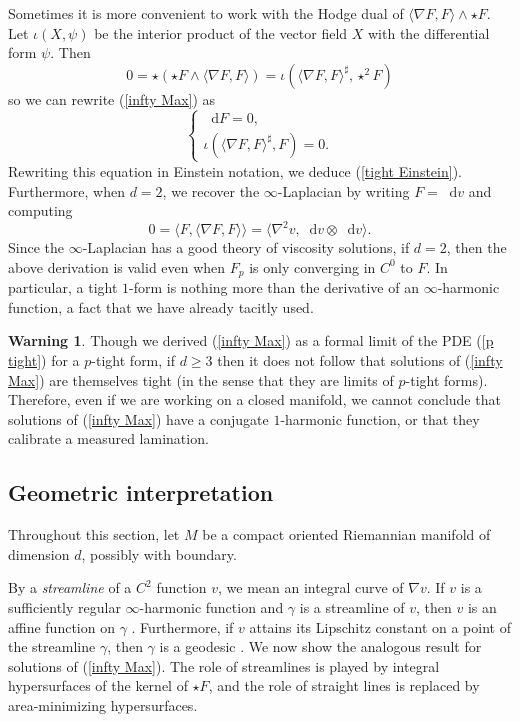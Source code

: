 \documentclass[reqno,11pt]{amsart}
\newcommand*\dif{\mathop{}\!\mathrm{d}}
\newcommand{\dfn}[1]{\emph{#1}\index{#1}}
\theoremstyle{definition}
\newtheorem{warning}[theorem]{Warning}
\numberwithin{equation}{section}
\begin{document}
Sometimes it is more convenient to work with the Hodge dual of $\langle \nabla F, F\rangle \wedge \star F$.
Let $\iota(X, \psi)$ be the interior product of the vector field $X$ with the differential form $\psi$.
Then 
$$0 = \star(\star F \wedge \langle \nabla F, F\rangle) = \iota(\langle \nabla F, F\rangle^\sharp, \star^2 F)$$
so we can rewrite (\ref{infty Max}) as
\begin{equation}\label{dual infty Max}
\begin{cases}
\dif F = 0, \\
\iota(\langle \nabla F, F\rangle^\sharp, F) = 0.
\end{cases}
\end{equation}
Rewriting this equation in Einstein notation, we deduce (\ref{tight Einstein}).
Furthermore, when $d = 2$, we recover the $\infty$-Laplacian by writing $F = \dif v$ and computing 
$$0 = \langle F, \langle \nabla F, F\rangle\rangle = \langle \nabla^2 v, \dif v \otimes \dif v\rangle.$$
Since the $\infty$-Laplacian has a good theory of viscosity solutions, if $d = 2$, then the above derivation is valid even when $F_p$ is only converging in $C^0$ to $F$.
In particular, a tight $1$-form is nothing more than the derivative of an $\infty$-harmonic function, a fact that we have already tacitly used.

\begin{warning}
Though we derived (\ref{infty Max}) as a formal limit of the PDE (\ref{p tight}) for a $p$-tight form, if $d \geq 3$ then it does not follow that solutions of (\ref{infty Max}) are themselves tight (in the sense that they are limits of $p$-tight forms).
Therefore, even if we are working on a closed manifold, we cannot conclude that solutions of (\ref{infty Max}) have a conjugate $1$-harmonic function, or that they calibrate a measured lamination.
\end{warning}

\subsection{Geometric interpretation}\label{EL interpretation}
Throughout this section, let $M$ be a compact oriented Riemannian manifold of dimension $d$, possibly with boundary.

By a \dfn{streamline} of a $C^2$ function $v$, we mean an integral curve of $\nabla v$.
If $v$ is a sufficiently regular $\infty$-harmonic function and $\gamma$ is a streamline of $v$, then $v$ is an affine function on $\gamma$ \cite[Theorem 1.5]{Sheffield12}.
Furthermore, if $v$ attains its Lipschitz constant on a point of the streamline $\gamma$, then $\gamma$ is a geodesic \cite[Theorem 5.2]{daskalopoulos2020transverse}.
We now show the analogous result for solutions of (\ref{infty Max}).
The role of streamlines is played by integral hypersurfaces of the kernel of $\star F$, and the role of straight lines is replaced by area-minimizing hypersurfaces.
\end{document}
